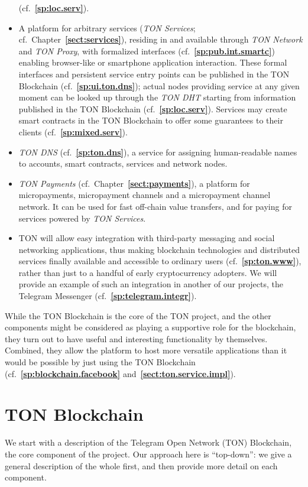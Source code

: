 \documentclass[12pt,oneside]{article}
\def\refpoint#1{{\rm\textbf{\ref{#1}}}}
\let\ptref=\refpoint
\def\mysection#1{\section{#1}\fancyhead[C]{\textsc{Chapter \textbf{\thesection.} #1}}}
\begin{document}
\begin{itemize}
  (cf.~\ptref{sp:loc.serv}).
\item A platform for arbitrary services ({\em TON Services};
  cf.\ Chapter~\ptref{sect:services}), residing in and available
  through {\em TON Network\/} and {\em TON Proxy}, with formalized
  interfaces (cf.~\ptref{sp:pub.int.smartc}) enabling browser-like or
  smartphone application interaction. These formal interfaces and
  persistent service entry points can be published in the TON
  Blockchain (cf.~\ptref{sp:ui.ton.dns}); actual nodes providing
  service at any given moment can be looked up through the {\em TON
    DHT\/} starting from information published in the TON Blockchain
  (cf.~\ptref{sp:loc.serv}). Services may create smart contracts in
  the TON Blockchain to offer some guarantees to their clients
  (cf.~\ptref{sp:mixed.serv}).
\item {\em TON DNS\/} (cf.~\ptref{sp:ton.dns}), a service for
  assigning human-readable names to accounts, smart contracts,
  services and network nodes.
\item {\em TON Payments\/} (cf.\ Chapter~\ptref{sect:payments}), a
  platform for micropayments, micropayment channels and a micropayment
  channel network. It can be used for fast off-chain value transfers,
  and for paying for services powered by {\em TON Services}.
\item TON will allow easy integration with third-party messaging and
  social networking applications, thus making blockchain technologies
  and distributed services finally available and accessible to
  ordinary users (cf.~\ptref{sp:ton.www}), rather than just to a
  handful of early cryptocurrency adopters. We will provide an example
  of such an integration in another of our projects, the Telegram
  Messenger (cf.~\ptref{sp:telegram.integr}).
\end{itemize}

While the TON Blockchain is the core of the TON project, and the other
components might be considered as playing a supportive role for the
blockchain, they turn out to have useful and interesting functionality
by themselves. Combined, they allow the platform to host more
versatile applications than it would be possible by just using the TON
Blockchain (cf.~\ptref{sp:blockchain.facebook}
and~\ptref{sect:ton.service.impl}).

\clearpage
\mysection{TON Blockchain}\label{sect:blockchain}

We start with a description of the Telegram Open Network (TON)
Blockchain, the core component of the project. Our approach here is
``top-down'': we give a general description of the whole first, and
then provide more detail on each component.
\end{document}
